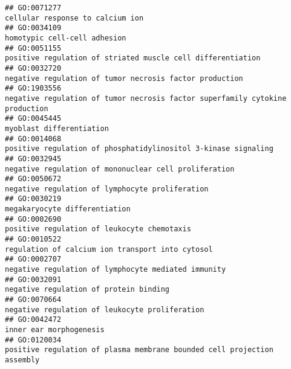 \documentclass[
]{article}
\begin{document}
\begin{verbatim}
## GO:0071277                                                                                                                 cellular response to calcium ion
## GO:0034109                                                                                                                     homotypic cell-cell adhesion
## GO:0051155                                                                                      positive regulation of striated muscle cell differentiation
## GO:0032720                                                                                          negative regulation of tumor necrosis factor production
## GO:1903556                                                                     negative regulation of tumor necrosis factor superfamily cytokine production
## GO:0045445                                                                                                                         myoblast differentiation
## GO:0014068                                                                                   positive regulation of phosphatidylinositol 3-kinase signaling
## GO:0032945                                                                                            negative regulation of mononuclear cell proliferation
## GO:0050672                                                                                                  negative regulation of lymphocyte proliferation
## GO:0030219                                                                                                                    megakaryocyte differentiation
## GO:0002690                                                                                                      positive regulation of leukocyte chemotaxis
## GO:0010522                                                                                                 regulation of calcium ion transport into cytosol
## GO:0002707                                                                                              negative regulation of lymphocyte mediated immunity
## GO:0032091                                                                                                           negative regulation of protein binding
## GO:0070664                                                                                                   negative regulation of leukocyte proliferation
## GO:0042472                                                                                                                          inner ear morphogenesis
## GO:0120034                                                                          positive regulation of plasma membrane bounded cell projection assembly

\end{verbatim}
\end{document}
